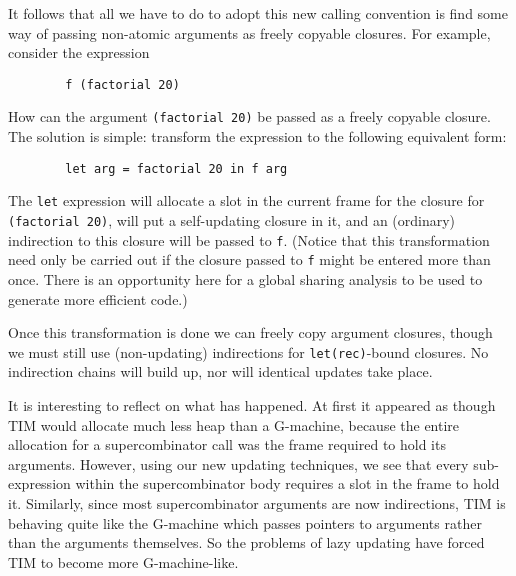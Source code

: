 It follows that all we have to do to adopt this new calling convention is
find some way of passing non-atomic arguments as freely copyable closures.
For example, consider the expression
\begin{verbatim}
        f (factorial 20)
\end{verbatim}
How can the
argument \mbox{\tt (factorial\ 20)} be passed as a freely copyable closure.
The solution is simple: transform the expression to the following
equivalent form:
\begin{verbatim}
        let arg = factorial 20 in f arg
\end{verbatim}
The \mbox{\tt let} expression will allocate a slot in the current frame for
the closure for \mbox{\tt (factorial\ 20)}, will put a self-updating closure in it,
and an (ordinary) indirection to this closure will be passed
to \mbox{\tt f}.
(Notice that this transformation need only be carried out if the closure
passed to \mbox{\tt f} might be entered more than once.
There is an opportunity here
for a global sharing analysis to be used to generate more efficient code.)

Once this transformation
is done we can freely copy argument closures, though we must
still use (non-updating) indirections for \mbox{\tt let(rec)}-bound closures.  No
indirection chains will build up, nor will identical updates take place.

It is interesting to reflect on what has happened.  At first it appeared as
though TIM would allocate much less heap than a G-machine, because
the entire allocation for a supercombinator call was the frame
required to hold its arguments.  However, using our new updating techniques,
we see that every sub-expression
within the supercombinator body requires a slot in the frame to hold it.
Similarly, since most supercombinator arguments are now indirections,
TIM is behaving quite like the G-machine which passes pointers to arguments
rather than the arguments themselves.  So the problems of lazy updating
have forced TIM to become more G-machine-like.


